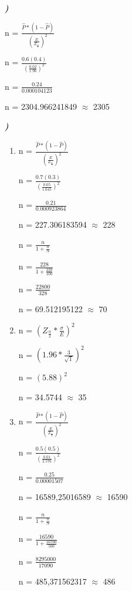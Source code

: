 \documentclass[12pt]{article}
\newcounter{instn}
\newcommand{\instnum}{\arabic{instn}}
\newcommand{\myline}[1]{
    \emph{\textbf{#1)}}
    \addtocounter{instn}{1}
}
\newenvironment{question}
 {
    \myline{\instnum} 
    }
    {
 }
\begin{document}

    \begin{question}
        
        n = $\frac{\hat{P}*(1-\hat{P})}{(\frac{E}{Z_\frac{\alpha}{2}})^2}$

        n = $\frac{0.6(0.4)}{(\frac{0.02}{1.96})^2}$

        n = $\frac{0.24}{0.000104123}$

        n = 2304.966241849 $\approx$ 2305 

    \end{question}


    \begin{question}
        
        \begin{enumerate}[label={\textbf{\alph*)}}]

            \item n = $\frac{\hat{P}*(1-\hat{P})}{(\frac{E}{Z_\frac{\alpha}{2}})^2}$
            
                  n = $\frac{0.7(0.3)}{(\frac{0.05}{1.645})^2}$

                  n = $\frac{0.21}{0.000923864}$

                  n = 227.306183594 $\approx$ 228

                  n = $\frac{n}{1+ \frac{n}{N}}$

                  n = $\frac{228}{1+\frac{228}{100}}$

                  n = $\frac{22800}{328}$

                  n = 69.512195122 $\approx$ 70

            \item n = $(Z_\frac{\alpha}{2} * \frac{\sigma}{E})^2$

                  n = $(1.96 * \frac{3}{\sqrt{1}})^2$

                  n = $(5.88)^2$

                  n = 34.5744 $\approx$ 35

            \item n = $\frac{\hat{P}*(1-\hat{P})}{(\frac{E}{Z_\frac{\alpha}{2}})^2}$
            
                  n = $\frac{0.5(0.5)}{(\frac{0.01}{2.576})^2}$

                  n = $\frac{0.25}{0.00001507}$

                  n = 16589,25016589 $\approx$ 16590

                  n = $\frac{n}{1+ \frac{n}{N}}$

                  n = $\frac{16590}{1+\frac{16590}{500}}$

                  n = $\frac{8295000}{17090}$

                  n = 485,371562317 $\approx$ 486

        \end{enumerate}
    \end{question}
\end{document}
